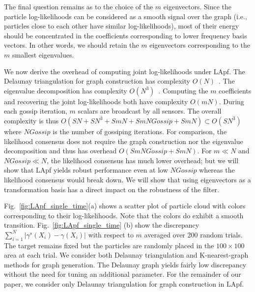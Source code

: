 \documentclass[10pt,letterpaper,final]{article}
\begin{document}
The final question remains as to the choice of the $m$ eigenvectors. Since the particle log-likelihoods can be considered as a smooth signal over the graph (i.e., particles close to each other have similar log-likelihoods), most of their energy should be concentrated in the coefficients corresponding to lower frequency basis vectors. In other words, we should retain the $m$ eigenvectors corresponding to the $m$ smallest eigenvalues. 

We now derive the overhead of computing joint log-likelihoods under LApf. The Delaunay triangulation for graph construction has complexity $O(N)$~\cite{Boissonnat1998}. The eigenvalue decomposition has complexity $O(N^3)$~\cite{Demmel2007}. Computing the $m$ coefficients and recovering the joint log-likelihoods both have complexity $O(mN)$. During each gossip iteration, $m$ scalars are broadcast by all sensors. The overall complexity is thus $O(SN+SN^3+SmN+SmNGossip+SmN)\subset O(SN^3)$ where $NGossip$ is the number of gossiping iterations. For comparison, the likelihood consensus does not require the graph construction nor the eigenvalue decomposition and thus has overhead $O(SmNGossip+SmN)$. For $m\ll N$ and $NGossip \ll N$, the likelihood consensus has much lower overhead; but we will show that LApf yields robust performance even at low $NGossip$ whereas the likelihood consensus would break down. We will show that using eigenvectors as a transformation basis has a direct impact on the robustness of the filter. 

Fig.~\ref{fig:LApf_single_time}(a) shows a scatter plot of particle cloud with colors corresponding to their log-likelihoods. Note that the colors do exhibit a smooth transition. Fig.~\ref{fig:LApf_single_time} (b) show the discrepancy $\sum_{i=1}^N|\gamma^s(X_i)-\gamma(X_i)|$ with respect to $m$ averaged over 200 random trials. The target remains fixed but the particles are randomly placed in the $100\times 100$ area at each trial. We consider both Delaunay triangulation and K-nearest-graph methods for graph generation. The Delaunay graph yields fairly low discrepancy without the need for tuning an additional parameter. For the remainder of our paper, we consider only Delaunay triangulation for graph construction in LApf. 
\end{document}
